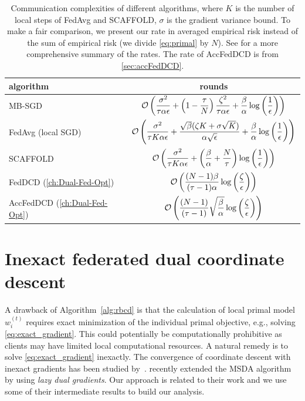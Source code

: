 \begin{table}[t]
    \small
    \centering
    \begin{tabular}{lc}    
    \toprule 
    algorithm & rounds  \\
    \midrule
    MB-SGD & $\displaystyle \mathcal{O} \left( \frac{\sigma^2}{\tau \alpha \epsilon}  + \left( 1 - \frac{\tau}{N} \right) \frac{\zeta^2}{\tau \alpha \epsilon} + \frac{\beta}{\alpha} \log\left(\frac{1}{\epsilon}\right) \right) $ \\ 
    FedAvg (local SGD) & $\displaystyle \mathcal{O} \left( \frac{\sigma^2}{\tau K \alpha \epsilon} + \frac{\sqrt{\beta}( \zeta K + \sigma \sqrt{K} ) }{\alpha \sqrt{\epsilon}} + \frac{\beta}{\alpha} \log\left(\frac{1}{\epsilon}\right) \right)$  \\
    SCAFFOLD & $\displaystyle \mathcal{O} \left( \frac{\sigma^2}{\tau K \alpha \epsilon}  + \left(\frac{\beta}{\alpha} +\frac{N}{\tau} \right)\log\left(\frac{1}{\epsilon}\right) \right) $  \\
    FedDCD (\autoref{ch:Dual-Fed-Opt})& $\displaystyle \mathcal{O}\left( \frac{(N-1) \beta}{(\tau-1) \alpha} \log\left( \frac{\zeta}{ \epsilon } \right) \right)$ \\
    AccFedDCD (\autoref{ch:Dual-Fed-Opt})& $\displaystyle \mathcal{O}\left( \frac{(N-1) }{(\tau-1) } \sqrt{ \frac{\beta}{\alpha} } \log\left( \frac{\zeta}{ \epsilon } \right) \right)$ \\
    \bottomrule 
    \end{tabular}
    \caption{Communication complexities of different algorithms, where $K$ is the number of local steps of FedAvg and SCAFFOLD, $\sigma$ is the gradient variance bound. To make a fair comparison, we present our rate in averaged empirical risk instead of the sum of empirical risk (we divide \eqref{eq:primal} by $N$). See \citet{WoodworthPS20} for a more comprehensive summary of the rates. The rate of AccFedDCD is from \autoref{sec:accFedDCD}.}
    \label{tab:communicationComplexity}
\end{table}

\section{Inexact federated dual coordinate descent}
\label{sec:inexactFedDCD}
A drawback of Algorithm~\ref{alg:rbcd} is that the calculation of local primal model $w_i^{(t)}$ requires exact minimization of the individual primal objective, e.g., solving \eqref{eq:exact_gradient}. This could potentially be computationally prohibitive as clients may have limited local computational resources. 
A natural remedy is to solve \eqref{eq:exact_gradient} inexactly. The convergence of coordinate descent with inexact gradients has been studied by~\citet{CassioliLS13,TappendenRG16,LiuSY21}. \citet{LiuSY21} recently extended the MSDA algorithm~\citep{Scaman2017OptimalAF} by using \emph{lazy dual gradients}. Our approach is related to their work and we use some of their intermediate results to build our analysis. 

